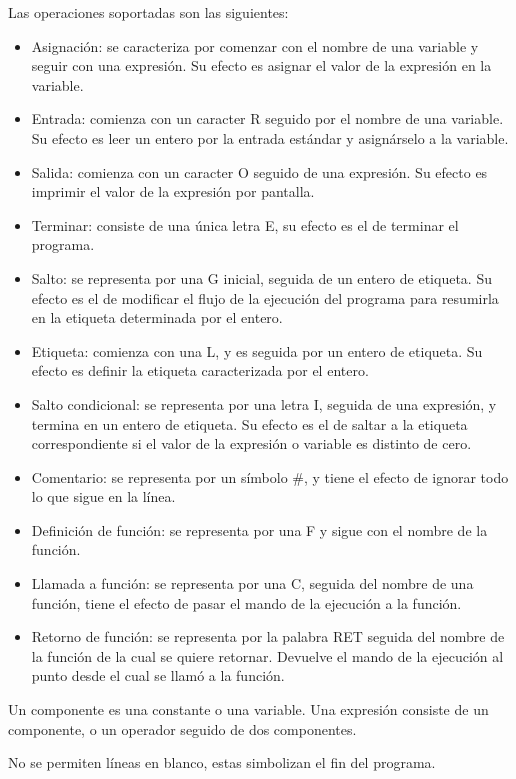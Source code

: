 \documentclass[12pt,spanish]{article}
\begin{document}
\noindent Las operaciones soportadas son las siguientes:
\begin{itemize}
\item{Asignación: se caracteriza por comenzar con el nombre de una variable y seguir con una expresión. Su efecto es asignar el valor de la expresión en la variable.}
\item{Entrada: comienza con un caracter R seguido por el nombre de una variable. Su efecto es leer un entero por la entrada estándar y asignárselo a la variable.}
\item{Salida: comienza con un caracter O seguido de una expresión. Su efecto es imprimir el valor de la expresión por pantalla.}
\item{Terminar: consiste de una única letra E, su efecto es el de terminar el programa.}
\item{Salto: se representa por una G inicial, seguida de un entero de etiqueta. Su efecto es el de modificar el flujo de la ejecución del programa para resumirla en la etiqueta determinada por el entero.}
\item{Etiqueta: comienza con una L, y es seguida por un entero de etiqueta. Su efecto es definir la etiqueta caracterizada por el entero.}
\item{Salto condicional: se representa por una letra I, seguida de una expresión, y termina en un entero de etiqueta. Su efecto es el de saltar a la etiqueta correspondiente si el valor de la expresión o variable es distinto de cero.}
\item{Comentario: se representa por un símbolo \#, y tiene el efecto de ignorar todo lo que sigue en la línea.}
\item{Definición de función: se representa por una F y sigue con el nombre de la función.}
\item{Llamada a función: se representa por una C, seguida del nombre de una función, tiene el efecto de pasar el mando de la ejecución a la función.}
\item{Retorno de función: se representa por la palabra RET seguida del nombre de la función de la cual se quiere retornar. Devuelve el mando de la ejecución al punto desde el cual se llamó a la función.}
\end{itemize}

\noindent Un componente es una constante o una variable. Una expresión consiste de un componente, o un operador seguido de dos componentes.

\noindent No se permiten líneas en blanco, estas simbolizan el fin del programa.
\end{document}
